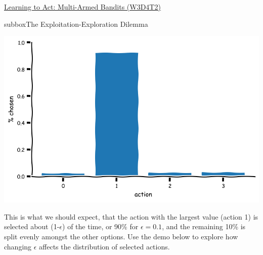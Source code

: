 \begin{textbox}{\href{https://compneuro.neuromatch.io/tutorials/W3D4_ReinforcementLearning/student/W3D4_Tutorial2.html}{Learning to Act: Multi-Armed Bandits (W3D4T2)} }
\begin{subbox}{subbox}{The Exploitation-Exploration Dilemma}
\begin{center}
\includegraphics[scale=0.18]{Figures/RL/RL_Figure8.png}
\end{center}
This is what we should expect, that the action with the largest value (action 1) is selected about (1-$\epsilon$) of the time, or 90\% for $\epsilon = 0.1$, and the remaining 10\% is split evenly amongst the other options. Use the demo below to explore how changing $\epsilon$ affects the distribution of selected actions.

\end{subbox}
\end{textbox}
